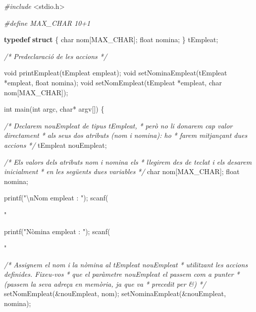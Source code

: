 \documentclass[]{book}
\newenvironment{Shaded}{\begin{snugshade}}{\end{snugshade}}
\newcommand{\KeywordTok}[1]{\textcolor[rgb]{0.13,0.29,0.53}{\textbf{#1}}}
\newcommand{\DataTypeTok}[1]{\textcolor[rgb]{0.13,0.29,0.53}{#1}}
\newcommand{\SpecialCharTok}[1]{\textcolor[rgb]{0.00,0.00,0.00}{#1}}
\newcommand{\StringTok}[1]{\textcolor[rgb]{0.31,0.60,0.02}{#1}}
\newcommand{\ImportTok}[1]{#1}
\newcommand{\CommentTok}[1]{\textcolor[rgb]{0.56,0.35,0.01}{\textit{#1}}}
\newcommand{\PreprocessorTok}[1]{\textcolor[rgb]{0.56,0.35,0.01}{\textit{#1}}}
\newcommand{\NormalTok}[1]{#1}
\begin{document}
\begin{Shaded}
\begin{Highlighting}[]
\PreprocessorTok{#include }\ImportTok{<stdio.h>}

\PreprocessorTok{#define MAX_CHAR 10+1}

\KeywordTok{typedef} \KeywordTok{struct}\NormalTok{ \{}
    \DataTypeTok{char}\NormalTok{ nom[MAX_CHAR];}
    \DataTypeTok{float}\NormalTok{ nomina;}
\NormalTok{\} tEmpleat;}

\CommentTok{/* Predeclaració de les accions */}

\DataTypeTok{void}\NormalTok{ printEmpleat(tEmpleat empleat);}
\DataTypeTok{void}\NormalTok{ setNominaEmpleat(tEmpleat *empleat, }\DataTypeTok{float}\NormalTok{ nomina);}
\DataTypeTok{void}\NormalTok{ setNomEmpleat(tEmpleat *empleat, }\DataTypeTok{char}\NormalTok{ nom[MAX_CHAR]);}

\DataTypeTok{int}\NormalTok{ main(}\DataTypeTok{int}\NormalTok{ argc, }\DataTypeTok{char}\NormalTok{* argv[]) \{}

    \CommentTok{/* Declarem nouEmpleat de tipus tEmpleat,}
\CommentTok{     * però no li donarem cap valor directament}
\CommentTok{     * als seus dos atributs (nom i nomina): ho }
\CommentTok{     * farem mitjançant dues accions }
\CommentTok{     */}
\NormalTok{    tEmpleat nouEmpleat;}
   
    \CommentTok{/* Els valors dels atributs nom i nomina els}
\CommentTok{     * llegirem des de teclat i els desarem inicialment}
\CommentTok{     * en les següents dues variables }
\CommentTok{     */}
    \DataTypeTok{char}\NormalTok{ nom[MAX_CHAR];}
    \DataTypeTok{float}\NormalTok{ nomina;}
   
\NormalTok{    printf(}\StringTok{"}\SpecialCharTok{\textbackslash{}n}\StringTok{Nom empleat : "}\NormalTok{);}
\NormalTok{    scanf(}\StringTok{"%
      
\NormalTok{    printf(}\StringTok{"Nòmina empleat : "}\NormalTok{);}
\NormalTok{    scanf(}\StringTok{"%
   
    \CommentTok{/* Assignem el nom i la nòmina al tEmpleat nouEmpleat}
\CommentTok{     * utilitzant les accions definides. Fixeu-vos}
\CommentTok{     * que el paràmetre nouEmpleat el passem com a punter}
\CommentTok{     * (passem la seva adreça en memòria, ja que va }
\CommentTok{     * precedit per &) }
\CommentTok{     */}
\NormalTok{    setNomEmpleat(&nouEmpleat, nom);}
\NormalTok{    setNominaEmpleat(&nouEmpleat, nomina);}
   
}}
\end{Highlighting}
\end{Shaded}
\end{document}
